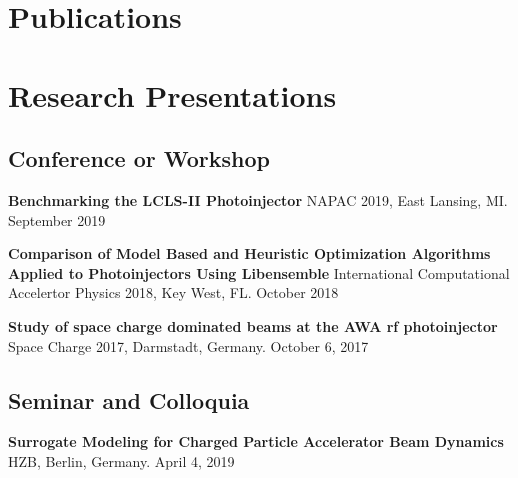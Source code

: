 \documentclass[11pt,a4paper,sans]{moderncv}        %
\begin{document}
\newpage
\section{Publications}
%






\section{Research Presentations}
\subsection{Conference or Workshop} %
\textbf{Benchmarking the LCLS-II Photoinjector}\newline
NAPAC 2019, East Lansing, MI. September 2019
\vspace{0.3em}

\textbf{Comparison of Model Based and Heuristic Optimization Algorithms \newline
	Applied to Photoinjectors Using Libensemble}\newline
International Computational Accelertor Physics 2018, Key West, FL. October 2018
\vspace{0.3em}

\textbf{Study of space charge dominated beams at the AWA rf photoinjector}\newline
Space Charge 2017, Darmstadt, Germany. October 6, 2017

\subsection{Seminar and Colloquia}
\textbf{Surrogate Modeling for Charged Particle Accelerator Beam Dynamics}\newline
HZB, Berlin, Germany. April 4, 2019
\vspace{0.3em}
\end{document}

